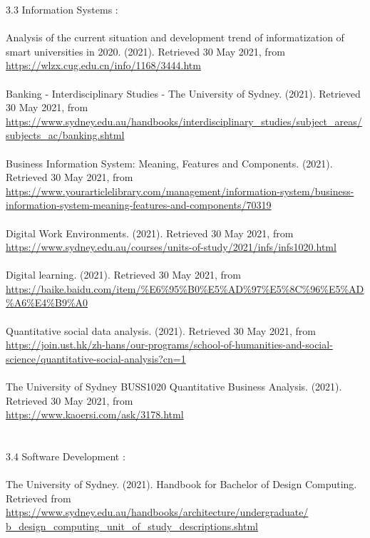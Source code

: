 \documentclass{article}
\begin{document}
	3.3 Information Systems : \\
	\\
	Analysis of the current situation and development trend of informatization of smart universities in 2020. (2021). Retrieved 30 May 2021, from \\
	\url{https://wlzx.cug.edu.cn/info/1168/3444.htm }\\
	\\
	Banking - Interdisciplinary Studies - The University of Sydney. (2021). Retrieved 30 May 2021, from \\
	\url{https://www.sydney.edu.au/handbooks/interdisciplinary_studies/subject_areas/subjects_ac/banking.shtml }\\
	\\
	Business Information System: Meaning, Features and Components. (2021). Retrieved 30 May 2021, from \\
	\url{https://www.yourarticlelibrary.com/management/information-system/business-information-system-meaning-features-and-components/70319 }\\
	\\
	Digital Work Environments. (2021). Retrieved 30 May 2021, from \\
	\url{ https://www.sydney.edu.au/courses/units-of-study/2021/infs/infs1020.html }\\
	\\
	Digital learning. (2021). Retrieved 30 May 2021, from\\
	\url{ https://baike.baidu.com/item/%E6%95%B0%E5%AD%97%E5%8C%96%E5%AD%A6%E4%B9%A0 } \\
	\\
	Quantitative social data analysis. (2021). Retrieved 30 May 2021, from \\
	\url{ https://join.ust.hk/zh-hans/our-programs/school-of-humanities-and-social-science/quantitative-social-analysis?cn=1 } \\
	\\
	The University of Sydney BUSS1020 Quantitative Business Analysis. (2021). Retrieved 30 May 2021, from \\
	\url{https://www.kaoersi.com/ask/3178.html }\\
	\\
	\\
	3.4 Software Development :\\
	\\
	The University of Sydney. (2021). Handbook for Bachelor of Design Computing. Retrieved from\\ \url{https://www.sydney.edu.au/handbooks/architecture/undergraduate/
	b_design_computing_unit_of_study_descriptions.shtml}\\
\end{document}
